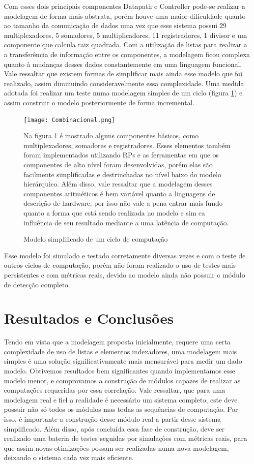 \documentclass[conference]{IEEEtran}
\begin{document}
Com esses dois principais componentes Datapath e Controller pode-se realizar a modelagem de forma mais abstrata, porém houve uma maior dificuldade quanto ao tamanho da comunicação de dados uma vez que esse sistema possui 29 multiplexadores, 5 somadores, 5 multiplicadores, 11 registradores, 1 divisor e um componente que calcula raiz quadrada. Com a utilização de listas para realizar a a transferência de informação entre os componentes, a modelagem ficou complexa quanto à mudanças desses dados constantemente em uma linguagem funcional. Vale ressaltar que existem formas de simplificar mais ainda esse modelo que foi realizado, assim diminuindo consideravelmente essa complexidade. Uma medida adotada foi realizar um teste numa modelagem simples de  um ciclo (figura \ref{combinacional})  e assim construir o modelo posteriormente de forma incremental. 
\begin{figure}[htbp]
	\centerline{\texttt{[image: Combinacional.png]}}
	\caption{Modelo simplificado de um ciclo de computação}
	\label{combinacional}
Na figura \ref{combinacional} é mostrado alguns componentes básicos, como multiplexadores, somadores e registradores. Esses elementos também foram implementados utilizando RPs e as ferramentas em que os componentes de alto nível foram desenvolvidas, porém elas são facilmente simplificadas e destrinchadas no nível baixo do modelo hierárquico. Além disso, vale ressaltar que a modelagem desses componentes aritméticos é bem variável quanto a linguagens de descrição de hardware, por isso não vale a pena entrar mais fundo quanto a forma que está sendo realizada no modelo e sim ca influência de seu resultado mediante a uma latência de computação. 
\end{figure}

Esse modelo foi simulado e testado corretamente diversas vezes e com o teste de outros ciclos de computação, porém não foram realizado o uso de testes mais persistentes e com métricas reais, devido ao modelo ainda não possuir o módulo de detecção completo.
	\section{Resultados e Conclusões}
	
	Tendo em vista que a modelagem proposta inicialmente, requere uma certa complexidade de uso de listas e elementos indexadores, uma modelagem mais simples é uma solução significativamente mais mensurável para medir um dado modelo. Obtivemos resultados bem significantes quando implementamos esse modelo menor, e comprovamos a construção de módulos capazes de realizar as computações requeridas por essa correlação. Vale ressaltar, que para uma modelagem real e fiel a realidade é necessário um sistema completo, este deve possuir não só todos os módulos mas todas as sequências de computação. Por isso, é importante a construção desse módulo real a partir desse sistema simplificado. Além disso, após concluída essa fase de construção, deve ser realizado uma bateria de testes seguidas por simulações com métricas reais, para que assim novas otimizações possam ser realizadas numa nova modelagem, deixando o sistema cada vez mais eficiente.  
	
\end{document}
